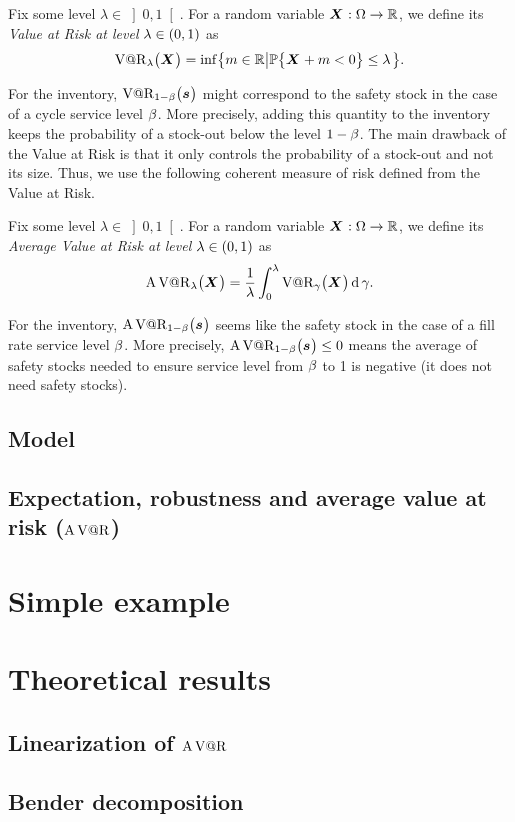 \begin{defn}
Fix some level $\lambda\in\left]0,1\right[$. For a random variable $\va X:\scenarios\to\RR$, we define its \emph{Value at Risk at level $\lambda\in\bracket{0,1}$} as
$$\VaR_{\lambda}\bracket{\va X} = \inf\crbracket{m\in\RR\left|\prob\crbracket{\va X+m<0}\le\lambda\right.}.$$
\end{defn}
For the inventory, $\VaR_{1-\servicelvl}\bracket{\va\inventory}$ might correspond to the safety stock in the case of a cycle service level $\beta$.
More precisely, adding this quantity to the inventory keeps the probability of a stock-out below the level $1-\beta$.
The main drawback of the Value at Risk is that it only controls the probability of a stock-out and not its size.
Thus, we use the following coherent measure of risk defined from the Value at Risk.


\begin{defn}
Fix some level $\lambda\in\left]0,1\right[$. For a random variable $\va X:\scenarios\to\RR$, we define its \emph{Average Value at Risk at level $\lambda\in\bracket{0,1}$} as
$$\AVaR_{\lambda}\bracket{\va X} = \frac{1}{\lambda}\int_0^{\lambda}\VaR_{\gamma}\bracket{\va X}\diff\gamma.$$
\end{defn}
For the inventory, $\AVaR_{1-\servicelvl}\bracket{\va\inventory}$ seems like the safety stock in the case of a fill rate service level $\beta$.
More precisely, $\AVaR_{1-\servicelvl}\bracket{\va\inventory}\le 0$ means the average of safety stocks needed to ensure service level from $\beta$ to 1 is negative (\ie it does not need safety stocks).


\subsection{Model}



\subsection{Expectation, robustness and average value at risk ($\operatorname{A\operatorname{V@R}}$)}
\label{sec:multi-sourcing:stochastic:model:discussion}


\section{Simple example}


\section{Theoretical results}

\subsection{Linearization of $\operatorname{A\operatorname{V@R}}$}

\subsection{Bender decomposition}



